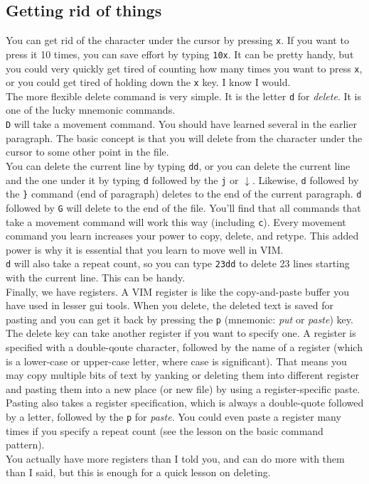 \documentclass[a4paper, 12pt]{article}
\begin{document}
\subsection{Getting rid of things}
\label{"Getting rid of things"}
You can get rid of the character under the cursor by pressing \texttt{x}. If you want to press it 10 times, you can save effort by typing \texttt{10x}. It can be pretty handy, but you could very quickly get tired of counting how many times you want to press \texttt{x}, or you could get tired of holding down the \texttt{x} key. I know I would.\\
The more flexible delete command is very simple. It is the letter \texttt{d} for \textit{delete}. It is one of the lucky mnemonic commands.\\
\texttt{D} will take a movement command. You should have learned several in the earlier paragraph. The basic concept is that you will delete from the character under the cursor to some other point in the file.\\
You can delete the current line by typing \texttt{dd}, or you can delete the current line and the one under it by typing \texttt{d} followed by the \texttt{j} or $\downarrow$. Likewise, \texttt{d} followed by the \texttt{\}} command (end of paragraph) deletes to the end of the current paragraph. \texttt{d} followed by \texttt{G} will delete to the end of the file. You'll find that all commands that take a movement command will work this way (including \texttt{c}). Every movement command you learn increases your power to copy, delete, and retype. This added power is why it is essential that you learn to move well in VIM.\\
\texttt{d} will also take a repeat count, so you can type \texttt{23dd} to delete 23 lines starting with the current line. This can be handy.\\
Finally, we have registers. A VIM register is like the copy-and-paste buffer you have used in lesser gui tools. When you delete, the deleted text is saved for pasting and you can get it back by pressing the \texttt{p} (mnemonic: \textit{put} or \textit{paste}) key. The delete key can take another register if you want to specify one. A register is specified with a double-qoute character, followed by the name of a register (which is a lower-case or upper-case letter, where case is significant). That means you may copy multiple bits of text by yanking or deleting them into different register and pasting them into a new place (or new file) by using a register-specific paste.\\
Pasting also takes a register specification, which is always a double-quote followed by a letter, followed by the \texttt{p} for \textit{paste}. You could even paste a register many times if you specify a repeat count (see the lesson on the basic command pattern).\\
You actually have more registers than I told you, and can do more with them than I said, but this is enough for a quick lesson on deleting.
\end{document}
